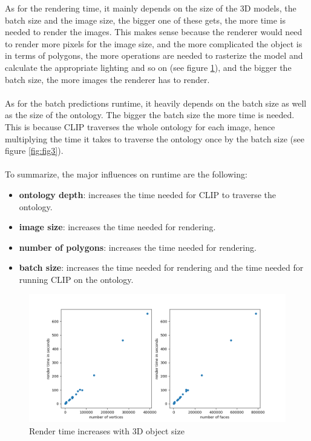\documentclass[a4paper,11pt,oneside]{article}
\begin{document}
  As for the rendering time, it mainly depends on the size of the 3D models, the batch size and the image size, the bigger one of these gets, the more time is needed to render the images. This makes sense because the renderer would need to render more pixels for the image size, and the more complicated the object is in terms of polygons, the more operations are needed to rasterize the model and calculate the appropriate lighting and so on (see figure \ref{fig:fig2}), and the bigger the batch size, the more images the renderer has to render. \\ \\
  As for the batch predictions runtime, it heavily depends on the batch size as well as the size of the ontology. The bigger the batch size the more time is needed. This is because CLIP traverses the whole ontology for each image, hence multiplying the time it takes to traverse the ontology once by the batch size (see figure \ref{fig:fig3}). \\ \\
  To summarize, the major influences on runtime are the following:
  \begin{itemize}
  \item \textbf{ontology depth}: increases the time needed for CLIP to traverse the ontology.
  \item \textbf{image size}: increases the time needed for rendering.
  \item \textbf{number of polygons}: increases the time needed for rendering.
  \item \textbf{batch size}: increases the time needed for rendering and the time needed for running CLIP on the ontology.
  \end{itemize}
  \begin{figure}[h]
  	\centering
  	\includegraphics[width=\textwidth]{figures/two_plots.png}
  	\caption{Render time increases with 3D object size}
  	\label{fig:fig2}
  \end{figure} 
\end{document}
